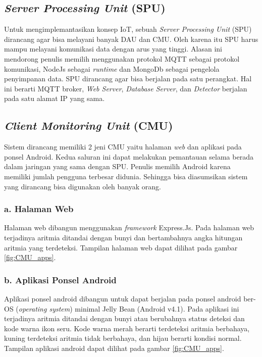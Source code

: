 \subsection{\textit{Server Processing Unit} (SPU)}
Untuk mengimplemantasikan konsep IoT, sebuah \textit{Server Processing Unit} (SPU) dirancang agar bisa melayani banyak DAU dan CMU. Oleh karena itu SPU harus mampu melayani komunikasi data dengan arus yang tinggi. Alasan ini mendorong penulis memilih menggunakan protokol MQTT sebagai protokol komunikasi, NodeJs sebagai \textit{runtime} dan MongoDb sebagai pengelola penyimpanan data. SPU dirancang agar bisa berjalan pada satu perangkat. Hal ini berarti MQTT broker, \textit{Web Server}, \textit{Database Server}, dan \textit{Detector} berjalan pada satu alamat IP yang sama. 

\subsection{\textit{Client Monitoring Unit} (CMU)}
Sistem dirancang memiliki 2 jeni CMU yaitu halaman \textit{web} dan aplikasi pada ponsel Android. Kedua saluran ini dapat melakukan pemantauan selama berada dalam jaringan yang sama dengan SPU. Penulis memilih Android karena memiliki jumlah pengguna terbesar didunia. Sehingga bisa diasumsikan sistem yang dirancang bisa digunakan oleh banyak orang.

\subsubsection{a. Halaman Web}
Halaman web dibangun menggunakan \textit{framework} Express.Js. Pada halaman web terjadinya aritmia ditandai dengan bunyi dan bertambahnya angka hitungan aritmia yang terdeteksi. Tampilan halaman web dapat dilihat pada gambar \ref{fig:CMU_apps}.

\subsubsection{b. Aplikasi Ponsel Android}
Aplikasi ponsel android dibangun untuk dapat berjalan pada ponsel android ber-OS (\textit{operating system}) minimal Jelly Bean (Android v4.1). Pada aplikasi ini terjadinya aritmia ditandai dengan bunyi atau berubahnya status deteksi dan kode warna ikon seru. Kode warna merah berarti terdeteksi aritmia berbahaya, kuning terdeteksi aritmia tidak berbahaya, dan hijau berarti kondisi normal. Tampilan aplikasi android dapat dilihat pada gambar \ref{fig:CMU_apps}.

